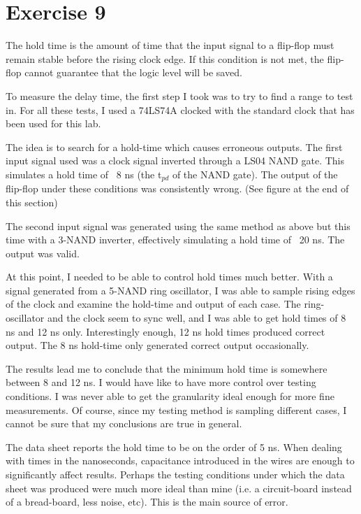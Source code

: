 \documentclass{article}
\begin{document}
\section{Exercise 9}
The hold time is the amount of time that the input signal to a flip-flop must
remain stable before the rising clock edge.  If this condition is not met, the
flip-flop cannot guarantee that the logic level will be saved.

To measure the delay time, the first step I took was to try to find a range to
test in.  For all these tests, I used a 74LS74A clocked with the standard clock
that has been used for this lab.

The idea is to search for a hold-time which causes erroneous outputs.  The
first input signal used was a clock signal inverted through a LS04 NAND gate.
This simulates a hold time of ~8 ns (the t$_{pd}$ of the NAND gate).  The output
of the flip-flop under these conditions was consistently wrong. (See figure at
the end of this section)

The second input signal was generated using the same method as above but this
time with a 3-NAND inverter, effectively simulating a hold time of ~20 ns.
The output was valid.

At this point, I needed to be able to control hold times much better.  With
a signal generated from a 5-NAND ring oscillator, I was able to sample rising
edges of the clock and examine the hold-time and output of each case.  The ring-oscillator and
the clock seem to sync well, and I was able to get hold times of 8 ns and 12 ns only.
Interestingly enough, 12 ns hold times produced correct output.  The 8 ns hold-time
only generated correct output occasionally.

The results lead me to conclude that the minimum hold time is somewhere between
8 and 12 ns.  I would have like to have more control over testing conditions.
I was never able to get the granularity ideal enough for more fine
measurements.  Of course, since my testing method is sampling different cases,
I cannot be sure that my conclusions are true in general.

The data sheet reports the hold time to be on the order of 5 ns.  When dealing
with times in the nanoseconds, capacitance introduced in the wires are enough
to significantly affect results.  Perhaps the testing conditions under which the
data sheet was produced were much more ideal than mine (i.e. a circuit-board
instead of a bread-board, less noise, etc).  This is the main source of error.
\end{document}
